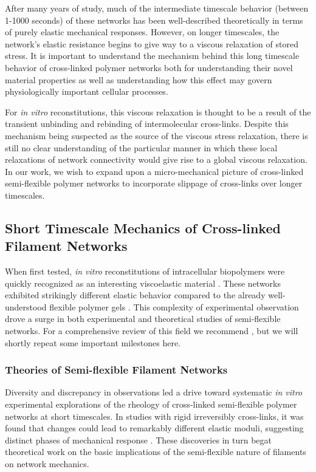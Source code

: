 \documentclass[pre,preprint]{revtex4-1}
\begin{document}
After many years of study, much of the intermediate timescale behavior (between 1-1000 seconds) of these networks has been well-described theoretically in terms of purely elastic mechanical responses.  However, on longer timescales, the network's elastic resistance begins to give way to a viscous relaxation of stored stress.   It is important to understand the mechanism behind this long timescale behavior of cross-linked polymer networks both for understanding their novel material properties as well as understanding how this effect may govern physiologically important cellular processes\cite{cell_rheo}.

For {\em in vitro} reconstitutions, this viscous relaxation is thought to be a result of the transient unbinding and rebinding of intermolecular cross-links\cite{rheo_crosslinksmatter,theo_crosslinkslip1}. Despite this mechanism being suspected as the source of the viscous stress relaxation, there is still no clear understanding of the particular manner in which these local relaxations of network connectivity would give rise to a global viscous relaxation.  In our work, we wish to expand upon a micro-mechanical picture of cross-linked semi-flexible polymer networks to incorporate slippage of cross-links over longer timescales.  


\subsection{Short Timescale Mechanics of Cross-linked Filament Networks}

When first tested, {\em in vitro} reconstitutions of intracellular biopolymers were quickly recognized as an interesting viscoelastic material \cite{rheo_actingel}.  These networks exhibited strikingly different elastic behavior compared to the already well-understood flexible polymer gels \cite{rheo_bench}.  This complexity of experimental observation drove a surge in both experimental and theoretical studies of semi-flexible networks.  For a comprehensive review of this field we recommend \cite{megareview}, but we will shortly repeat some important milestones here.

\subsubsection{Theories of Semi-flexible Filament Networks}
 
Diversity and discrepancy in observations led a drive toward systematic {\em in vitro} experimental explorations of the rheology of cross-linked semi-flexible polymer networks at short timescales.  In studies with rigid irreversibly cross-links, it was found that changes could lead to remarkably different elastic moduli, suggesting distinct phases of mechanical response \cite{rheo_marge}.  These discoveries in turn begat theoretical work on the basic implications of the semi-flexible nature of filaments on network mechanics.  
\end{document}
